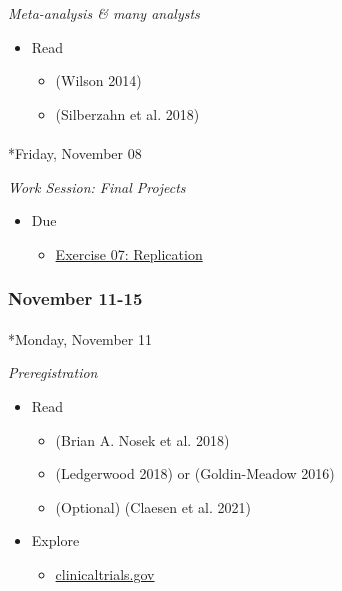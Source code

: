 \documentclass[
  letterpaper,
  DIV=11,
  numbers=noendperiod]{scrartcl}
\makeatletter
\let\oldparagraph\paragraph
\renewcommand{\paragraph}{
    \@ifstar
      \xxxParagraphStar
      \xxxParagraphNoStar
  }
\newcommand{\xxxParagraphStar}[1]{\oldparagraph*{#1}\mbox{}}
\newcommand{\xxxParagraphNoStar}[1]{\oldparagraph{#1}\mbox{}}
\providecommand{\tightlist}{%
  \setlength{\itemsep}{0pt}\setlength{\parskip}{0pt}}\usepackage{longtable,booktabs,array}
\makeatother
\begin{document}
\emph{Meta-analysis \& many analysts}

\begin{itemize}
\tightlist
\item
  Read

  \begin{itemize}
  \tightlist
  \item
    (Wilson 2014)
  \item
    (Silberzahn et al. 2018)
  \end{itemize}
\end{itemize}

\paragraph*{Friday, November 08}\label{friday-november-08}

\emph{Work Session: Final Projects}

\begin{itemize}
\tightlist
\item
  {Due}

  \begin{itemize}
  \tightlist
  \item
    \href{exercises/ex07-replication.qmd}{Exercise 07: Replication}
  \end{itemize}
\end{itemize}

\subsubsection*{November 11-15}\label{week-12}

\paragraph*{Monday, November 11}\label{monday-november-11}

\emph{Preregistration}

\begin{itemize}
\tightlist
\item
  Read

  \begin{itemize}
  \tightlist
  \item
    (Brian A. Nosek et al. 2018)
  \item
    (Ledgerwood 2018) or (Goldin-Meadow 2016)
  \item
    (Optional) (Claesen et al. 2021)
  \end{itemize}
\item
  Explore

  \begin{itemize}
  \tightlist
  \item
    \href{https://clinicaltrials.gov/}{clinicaltrials.gov}
  \end{itemize}
\end{itemize}
\end{document}
